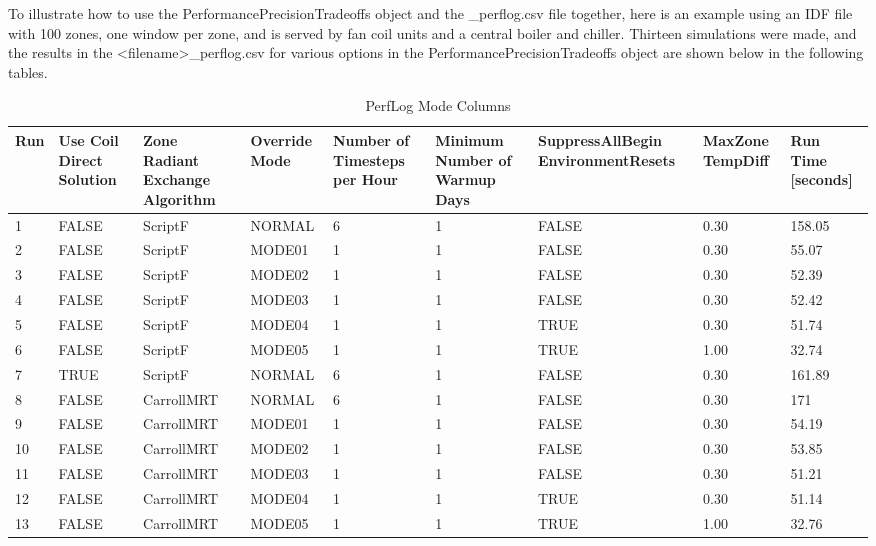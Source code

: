 To illustrate how to use the PerformancePrecisionTradeoffs object and the \_perflog.csv file together, here is an example using an IDF file with 100 zones, one window per zone, and is served by fan coil units and a central boiler and chiller. Thirteen simulations were made, and the results in the <filename>\_perflog.csv for various options in the PerformancePrecisionTradeoffs object are shown below in the following tables.


{\scriptsize
\begin{longtable}[c]{p{0.3in}p{0.75in}p{0.75in}p{0.75in}p{0.5in}p{0.5in}p{0.75in}p{0.75in}p{0.75in}}
\caption{PerfLog Mode Columns\label{table:perflog_mode_columns}} \tabularnewline
\toprule
Run & Use Coil Direct Solution & Zone Radiant Exchange Algorithm & Override Mode & Number of Timesteps per Hour & Minimum Number of Warmup Days & SuppressAllBegin EnvironmentResets & MaxZone TempDiff & Run Time {[}seconds{]} \tabularnewline
\midrule
\endfirsthead

1  & FALSE & ScriptF    & NORMAL & 6 & 1 & FALSE & 0.30 & 158.05 \tabularnewline
2  & FALSE & ScriptF    & MODE01 & 1 & 1 & FALSE & 0.30 & 55.07  \tabularnewline
3  & FALSE & ScriptF    & MODE02 & 1 & 1 & FALSE & 0.30 & 52.39  \tabularnewline
4  & FALSE & ScriptF    & MODE03 & 1 & 1 & FALSE & 0.30 & 52.42  \tabularnewline
5  & FALSE & ScriptF    & MODE04 & 1 & 1 & TRUE  & 0.30 & 51.74  \tabularnewline
6  & FALSE & ScriptF    & MODE05 & 1 & 1 & TRUE  & 1.00 & 32.74  \tabularnewline
7  & TRUE  & ScriptF    & NORMAL & 6 & 1 & FALSE & 0.30 & 161.89 \tabularnewline
8  & FALSE & CarrollMRT & NORMAL & 6 & 1 & FALSE & 0.30 & 171    \tabularnewline
9  & FALSE & CarrollMRT & MODE01 & 1 & 1 & FALSE & 0.30 & 54.19  \tabularnewline
10 & FALSE & CarrollMRT & MODE02 & 1 & 1 & FALSE & 0.30 & 53.85  \tabularnewline
11 & FALSE & CarrollMRT & MODE03 & 1 & 1 & FALSE & 0.30 & 51.21  \tabularnewline
12 & FALSE & CarrollMRT & MODE04 & 1 & 1 & TRUE  & 0.30 & 51.14  \tabularnewline
13 & FALSE & CarrollMRT & MODE05 & 1 & 1 & TRUE  & 1.00 & 32.76  \tabularnewline
\bottomrule
\end{longtable}
}

